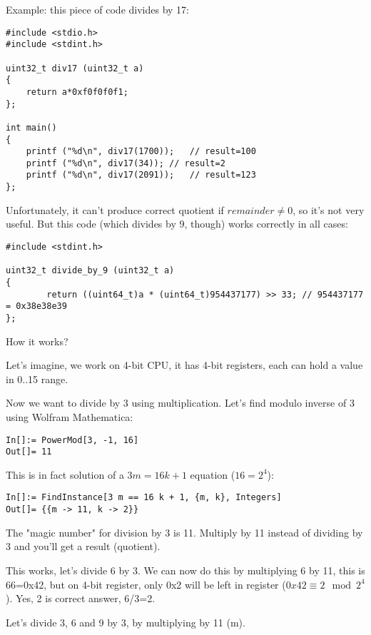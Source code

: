 
Example: this piece of code divides by 17:

\begin{lstlisting}[style=customc]
#include <stdio.h>
#include <stdint.h>

uint32_t div17 (uint32_t a)
{
	return a*0xf0f0f0f1;
};

int main()
{
	printf ("%d\n", div17(1700));	// result=100
	printf ("%d\n", div17(34));	// result=2
	printf ("%d\n", div17(2091));	// result=123
};
\end{lstlisting}

Unfortunately, it can't produce correct quotient if $remainder \neq 0$, so it's not very useful.
But this code (which divides by 9, though) works correctly in all cases:

\begin{lstlisting}[style=customc]
#include <stdint.h>

uint32_t divide_by_9 (uint32_t a)
{
        return ((uint64_t)a * (uint64_t)954437177) >> 33; // 954437177 = 0x38e38e39
};
\end{lstlisting}

How it works?

\myhrule{}

Let's imagine, we work on 4-bit CPU, it has 4-bit registers, each can hold a value in 0..15 range.

Now we want to divide by 3 using multiplication.
Let's find modulo inverse of 3 using Wolfram Mathematica:

\begin{lstlisting}
In[]:= PowerMod[3, -1, 16]
Out[]= 11
\end{lstlisting}

This is in fact solution of a $3m=16k+1$ equation ($16 = 2^4$):

\begin{lstlisting}
In[]:= FindInstance[3 m == 16 k + 1, {m, k}, Integers]
Out[]= {{m -> 11, k -> 2}}
\end{lstlisting}

The "magic number" for division by 3 is 11. Multiply by 11 instead of dividing by 3 and you'll get a result (quotient).

This works, let's divide 6 by 3. We can now do this by multiplying 6 by 11, this is 66=0x42,
but on 4-bit register, only 0x2 will be left in register ($0x42 \equiv 2 \mod 2^4$).
Yes, 2 is correct answer, 6/3=2.

Let's divide 3, 6 and 9 by 3, by multiplying by 11 (m).

